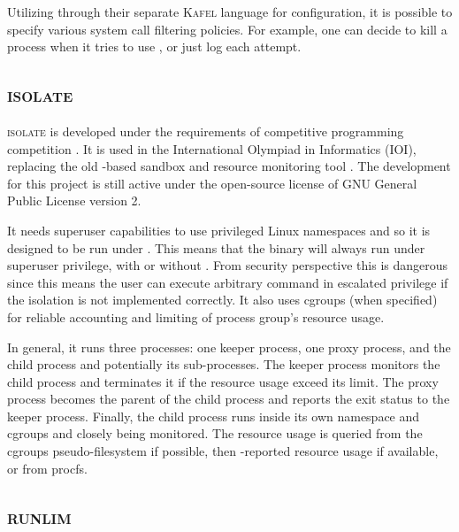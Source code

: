 Utilizing  through their separate \textsc{Kafel} \citep{LanguageLibrarySpecifying2019} language for configuration, it is possible to specify various system call filtering policies.
For example, one can decide to kill a process when it tries to use , or just log each attempt.


\subsection{\textsc{isolate}}

\textsc{isolate} \citep{SandboxSecurelyExecuting2019} is developed under the requirements of competitive programming competition \citep{marevs2012new}.
It is used in the International Olympiad in Informatics (IOI), replacing the old -based sandbox and resource monitoring tool \citep{maggioloCMSGrowingGrading2014}.
The development for this project is still active under the open-source license of GNU General Public License version 2.

It needs superuser capabilities to use privileged Linux namespaces and so it is designed to be run under .
This means that the binary will always run under superuser privilege, with or without .
From security perspective this is dangerous since this means the user can execute arbitrary command in escalated privilege if the isolation is not implemented correctly.
It also uses cgroups (when specified) for reliable accounting and limiting of process group's resource usage.

In general, it runs three processes: one keeper process, one proxy process, and the child process and potentially its sub-processes.
The keeper process monitors the child process and terminates it if the resource usage exceed its limit.
The proxy process becomes the parent of the child process and reports the exit status to the keeper process.
Finally, the child process runs inside its own namespace and cgroups and closely being monitored.
The resource usage is queried from the cgroups pseudo-filesystem if possible, then -reported resource usage if available, or from procfs.


\subsection{\textsc{runlim}}

